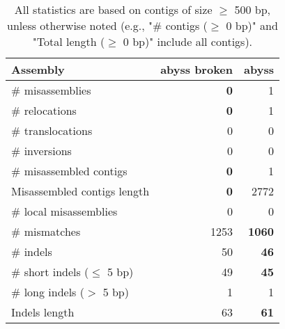 \documentclass[12pt,a4paper]{article}
\begin{document}
\begin{table}[ht]
\begin{center}
\caption{All statistics are based on contigs of size $\geq$ 500 bp, unless otherwise noted (e.g., "\# contigs ($\geq$ 0 bp)" and "Total length ($\geq$ 0 bp)" include all contigs).}
\begin{tabular}{|l*{2}{|r}|}
\hline
Assembly & abyss broken & abyss \\ \hline
\# misassemblies & {\bf 0} & 1 \\ \hline
\hspace{5mm}\# relocations & {\bf 0} & 1 \\ \hline
\hspace{5mm}\# translocations & 0 & 0 \\ \hline
\hspace{5mm}\# inversions & 0 & 0 \\ \hline
\# misassembled contigs & {\bf 0} & 1 \\ \hline
Misassembled contigs length & {\bf 0} & 2772 \\ \hline
\# local misassemblies & 0 & 0 \\ \hline
\# mismatches & 1253 & {\bf 1060} \\ \hline
\# indels & 50 & {\bf 46} \\ \hline
\hspace{5mm}\# short indels ($\leq$ 5 bp) & 49 & {\bf 45} \\ \hline
\hspace{5mm}\# long indels ($>$ 5 bp) & 1 & 1 \\ \hline
Indels length & 63 & {\bf 61} \\ \hline
\end{tabular}
\end{center}
\end{table}
\end{document}
